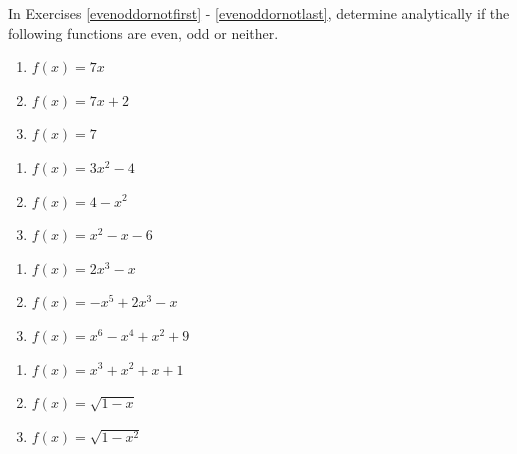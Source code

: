 In Exercises \ref{evenoddornotfirst} - \ref{evenoddornotlast}, determine analytically if the following functions are even, odd or neither.

\begin{multicols}{3}
\begin{enumerate}
\setcounter{enumi}{\value{HW}}

\item $f(x) = 7x$ \label{evenoddornotfirst}
\item $f(x) = 7x + 2$
\item $f(x) = 7$

\setcounter{HW}{\value{enumi}}
\end{enumerate}
\end{multicols}

\begin{multicols}{3}
\begin{enumerate}
\setcounter{enumi}{\value{HW}}

\item $f(x) = 3x^2 - 4$
\item $f(x) = 4-x^2$
\item $f(x) = x^2-x-6$

\setcounter{HW}{\value{enumi}}
\end{enumerate}
\end{multicols}


\begin{multicols}{3}
\begin{enumerate}
\setcounter{enumi}{\value{HW}}

\item $f(x) = 2x^3 - x$
\item $f(x) = -x^5 + 2x^3 - x$
\item $f(x) = x^{6} - x^{4} + x^{2} + 9$

\setcounter{HW}{\value{enumi}}
\end{enumerate}
\end{multicols}

\begin{multicols}{3}
\begin{enumerate}
\setcounter{enumi}{\value{HW}}

\item $f(x) = x^3 + x^2 + x + 1$
\item $f(x) = \sqrt{1-x}$
\item $f(x) =\sqrt{1-x^2}$

\setcounter{HW}{\value{enumi}}
\end{enumerate}
\end{multicols}

